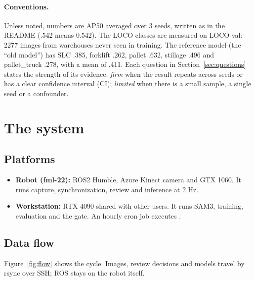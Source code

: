 \documentclass[11pt,a4paper]{article}
\begin{document}
\paragraph{Conventions.} Unless noted, numbers are AP50 averaged over 3 seeds,
written as in the README (.542 means 0.542). The LOCO classes are measured on
LOCO val: 2277 images from warehouses never seen in training. The reference model
(the ``old model'') has SLC .385, forklift .262, pallet .632, stillage .496 and
pallet\_truck .278, with a mean of .411. Each question in
Section~\ref{sec:questions} states the strength of its evidence: \emph{firm} when
the result repeats across seeds or has a clear confidence interval (CI);
\emph{limited} when there is a small sample, a single seed or a confounder.

\section{The system}

\subsection{Platforms}

\begin{itemize}
  \item \textbf{Robot (fml-22):} ROS2 Humble, Azure Kinect camera and GTX 1060.
    It runs capture, synchronization, review and inference at 2 Hz.
  \item \textbf{Workstation:} RTX 4090 shared with other users. It runs SAM3,
    training, evaluation and the gate. An hourly cron job executes
    .
\end{itemize}

\subsection{Data flow}

Figure~\ref{fig:flow} shows the cycle. Images, review decisions and models travel
by rsync over SSH; ROS stays on the robot itself.
\end{document}
